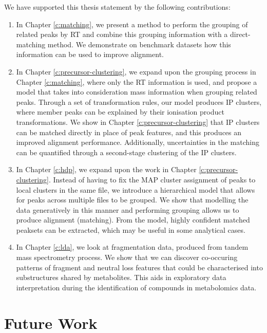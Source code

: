 We have supported this thesis statement by the following contributions:

\begin{enumerate}

\item In Chapter \ref{c:matching}, we present a method to perform the grouping of related peaks by RT and combine this grouping information with a direct-matching method. We demonstrate on benchmark datasets how this information can be used to improve alignment. 

\item In Chapter \ref{c:precursor-clustering}, we expand upon the grouping process in Chapter \ref{c:matching}, where only the RT information is used, and propose a model that takes into consideration mass information when grouping related peaks. Through a set of transformation rules, our model produces IP clusters, where member peaks can be explained by their ionisation product transformations. We show in Chapter \ref{c:precursor-clustering} that IP clusters can be matched directly in place of peak features, and this produces an improved alignment performance. Additionally, uncertainties in the matching can be quantified through a second-stage clustering of the IP clusters.

\item In Chapter \ref{c:hdp}, we expand upon the work in Chapter \ref{c:precursor-clustering}. Instead of having to fix the MAP cluster assignment of peaks to local clusters in the same file, we introduce a hierarchical model that allows for peaks across multiple files to be grouped. We show that modelling the data generatively in this manner and performing grouping allows us to produce alignment (matching). From the model, highly confident matched peaksets can be extracted, which may be useful in some analytical cases.

\item In Chapter \ref{c:lda}, we look at fragmentation data, produced from tandem mass spectrometry process. We show that we can discover co-occuring patterns of fragment and neutral loss features that could be characterised into substructures shared by metabolites. This aids in exploratory data interpretation during the identification of compounds in metabolomics data. 

\end{enumerate}

\section{Future Work}

